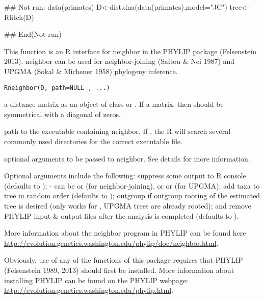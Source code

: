 \documentclass[a4paper]{book}
\begin{document}
%
\begin{SeeAlso}\relax
{}
\end{SeeAlso}
%
\begin{Examples}
\begin{ExampleCode}
## Not run: 
data(primates)
D<-dist.dna(data(primates),model="JC")
tree<-Rfitch(D)

## End(Not run)
\end{ExampleCode}
\end{Examples}
%
\begin{Description}\relax
This function is an R interface for neighbor in the PHYLIP package (Felsenstein 2013). neighbor can be used for neighbor-joining (Saitou \& Nei 1987) and UPGMA (Sokal \& Michener 1958) phylogeny inference.
\end{Description}
%
\begin{Usage}
\begin{verbatim}
Rneighbor(D, path=NULL , ...)
\end{verbatim}
\end{Usage}
%
\begin{Arguments}
\begin{ldescription}
\item[\code{D}] a distance matrix as an object of class  or . If a matrix, then  should be symmetrical with a diagonal of zeros.
\item[\code{path}] path to the executable containing neighbor. If , the R will search several commonly used directories for the correct executable file.
\item[\code{...}] optional arguments to be passed to neighbor. See details for more information.
\end{ldescription}
\end{Arguments}
%
\begin{Details}\relax
Optional arguments include the following:  suppress some output to R console (defaults to );  - can be  or  (for neighbor-joining), or  or  (for UPGMA);  add taxa to tree in random order (defaults to );  outgroup if outgroup rooting of the estimated tree is desired (only works for , UPGMA trees are already rooted); and  remove PHYLIP input \& output files after the analysis is completed (defaults to ).

More information about the neighbor program in PHYLIP can be found here \url{http://evolution.genetics.washington.edu/phylip/doc/neighbor.html}.

Obviously, use of any of the functions of this package requires that PHYLIP (Felsenstein 1989, 2013) should first be installed. More information about installing PHYLIP can be found on the PHYLIP webpage: \url{http://evolution.genetics.washington.edu/phylip.html}.
\end{Details}
\end{document}

